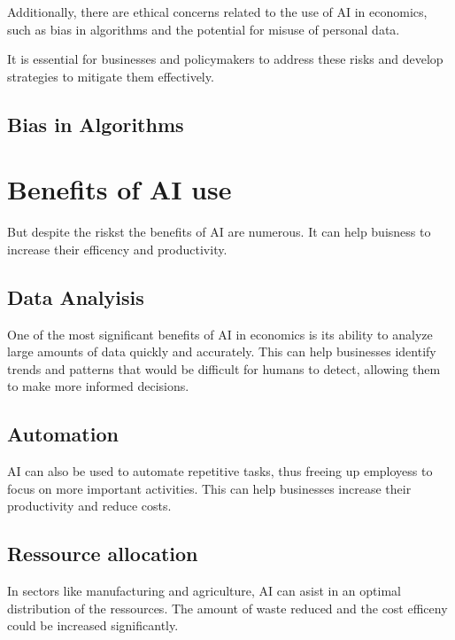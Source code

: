 Additionally, there are ethical concerns related to the use of AI in economics, such as bias in algorithms and the potential for misuse of personal data.

It is essential for businesses and policymakers to address these risks and develop strategies to mitigate them effectively.

\cite{AiEconomics}

\subsection{Bias in Algorithms}

\section{Benefits of AI use}
\label{sec:benefits-of-ai-use}

But despite the riskst the benefits of AI are numerous. It can help buisness to increase their efficency and productivity.

\cite{AiEconomics2}
\cite{AiBenefits}

\subsection{Data Analyisis}

One of the most significant benefits of AI in economics is its ability to analyze large amounts of data quickly and accurately. 
This can help businesses identify trends and patterns that would be difficult for humans to detect, allowing them to make more informed decisions.

\cite{AiDataAnalysis}

\subsection{Automation}

AI can also be used to automate repetitive tasks, thus freeing up employess to focus on more important activities.
This can help businesses increase their productivity and reduce costs.

\cite{AiAutomation}

\subsection{Ressource allocation}

In sectors like manufacturing and agriculture, AI can asist in an optimal distribution of the ressources. The amount of waste reduced and the cost efficeny could be increased significantly.


